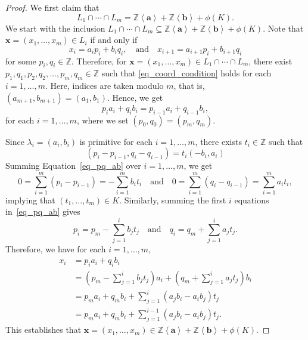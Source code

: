 \documentclass[10pt]{amsart}
\theoremstyle{plain}
\theoremstyle{definition}
\numberwithin{equation}{section}
\newcommand{\ZZ}{\mathbb{Z}}
\begin{document}
\begin{proof}
We first claim that 
\begin{equation}\label{eq_int_equal_sum}
L_1\cap \cdots \cap L_m=\mathbb{Z}\left<\mathbf{a}\right> + \mathbb{Z}\left<\mathbf{b}\right>+ \phi(K).
\end{equation}
We start with the inclusion  $L_1\cap \cdots \cap L_m\subseteq\mathbb{Z}\left<\mathbf{a}\right> + \mathbb{Z}\left<\mathbf{b}\right>+ \phi(K)$.
Note that $\mathbf{x}=(x_1, \dots, x_m)\in L_i$ if and only if 
\begin{equation}\label{eq_coord_condition}
x_i=a_ip_i+b_iq_i,\quad \text{and} \quad x_{i+1}=a_{i+1}p_i+b_{i+1}q_i
\end{equation}
for some $p_i, q_i\in \ZZ$. Therefore, for $\mathbf{x}=(x_1, \dots, x_m)\in L_1\cap\cdots \cap L_m$, there exist
$p_1, q_1, p_2, q_2, \dots, p_m, q_m\in \ZZ$ 
such that \eqref{eq_coord_condition} holds for each $i=1, \dots, m$. Here, indices are taken modulo $m$, that is, $(a_{m+1}, b_{m+1})=(a_1, b_1)$. Hence, we get 
\[
p_ia_i+q_ib_i= p_{i-1}a_i + q_{i-1}b_i,
\]
for each $i=1, \dots, m$, where we set $(p_0, q_0)=(p_m, q_m)$. 

Since $\lambda_i=(a_i, b_i)$ is primitive for each $i=1,\ldots,m$, there exists $t_i\in\ZZ$ such that
\begin{equation}\label{eq_pq_ab}
(p_i-p_{i-1}, q_i- q_{i-1}) = t_i (-b_i, a_i)
\end{equation}
Summing Equation~\eqref{eq_pq_ab} over $i=1, \dots, m$, we get 
\[
0=\sum_{i=1}^m (p_i-p_{i-1})  = - \sum_{i=1}^m b_it_i \quad \text{and} \quad 
0=\sum_{i=1}^m (q_i-q_{i-1})  =  \sum_{i=1}^m a_it_i,
\]
implying that $(t_1, \dots, t_m)\in K$. 
Similarly, summing the first $i$ equations in~\eqref{eq_pq_ab} gives
\[
p_i=p_m - \sum_{j=1}^i b_jt_j \quad \text{and} \quad q_i=q_m + \sum_{j=1}^i a_jt_j.
\]
Therefore, we have for each $i=1, \dots, m$,
\begin{align*}
x_i&=p_ia_i+q_ib_i\\
&=\left(p_m - \sum_{j=1}^i b_jt_j\right) a_i + \left( q_m + \sum_{j=1}^i a_jt_j \right) b_i \\
&=p_ma_i+q_mb_i + \sum_{j=1}^i (a_jb_i - a_ib_j) t_j\\
&= p_ma_i+q_mb_i + \sum_{j=1}^{i-1} (a_jb_i - a_ib_j) t_j.
\end{align*}
This establishes that $\mathbf{x}=(x_1, \dots, x_m)\in \mathbb{Z}\left<\mathbf{a}\right> + \mathbb{Z}\left<\mathbf{b}\right>+ \phi(K)$. 


\end{proof}
\end{document}
